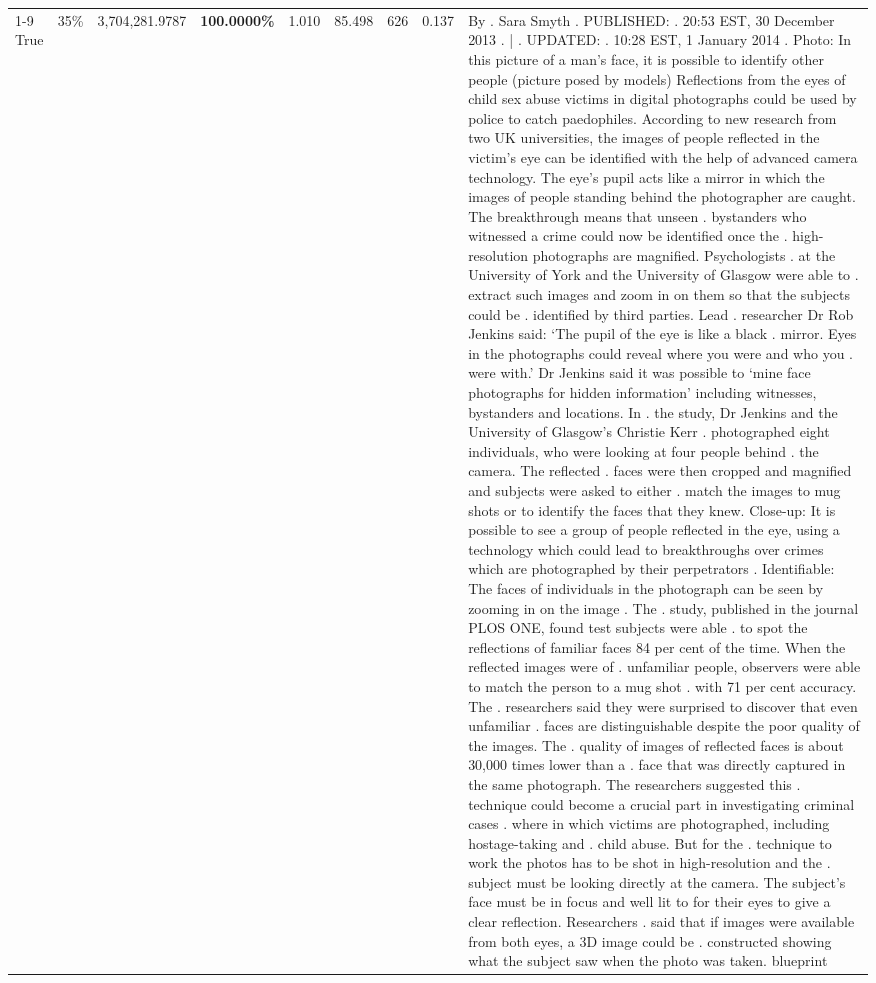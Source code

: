 \begin{table}[H]
\begin{tabular}{lllrlllll}
\cline{1-9} \cline{2-9}
True & 35\% & 3,704,281.9787 & \bfseries \color{red} 100.0000\% & 1.010 & 85.498 & 626 & 0.137 & By . Sara Smyth . PUBLISHED: . 20:53 EST, 30 December 2013 . | . UPDATED: . 10:28 EST, 1 January 2014 . Photo: In this picture of a man's face, it is possible to identify other people (picture posed by models) Reflections from the eyes of child sex abuse victims in digital photographs could be used by police to catch paedophiles. According to new research from two UK universities, the images of people reflected in the victim's eye can be identified with the help of advanced camera technology. The eye's pupil acts like a mirror in which the images of people standing behind the photographer are caught. The breakthrough means that unseen . bystanders who witnessed a crime could now be identified once the . high-resolution photographs are magnified. Psychologists . at the University of York and the University of Glasgow were able to . extract such images and zoom in on them so that the subjects could be . identified by third parties. Lead . researcher Dr Rob Jenkins said: ‘The pupil of the eye is like a black . mirror. Eyes in the photographs could reveal where you were and who you . were with.' Dr Jenkins said it was possible to ‘mine face photographs for hidden information' including witnesses, bystanders and locations. In . the study, Dr Jenkins and the University of Glasgow's Christie Kerr . photographed eight individuals, who were looking at four people behind . the camera. The reflected . faces were then cropped and magnified and subjects were asked to either . match the images to mug shots or to identify the faces that they knew. Close-up: It is possible to see a group of people reflected in the eye, using a technology which could lead to breakthroughs over crimes which are photographed by their perpetrators . Identifiable: The faces of individuals in the photograph can be seen by zooming in on the image . The . study, published in the journal PLOS ONE, found test subjects were able . to spot the reflections of familiar faces 84 per cent of the time. When the reflected images were of . unfamiliar people, observers were able to match the person to a mug shot . with 71 per cent accuracy. The . researchers said they were surprised to discover that even unfamiliar . faces are distinguishable despite the poor quality of the images. The . quality of images of reflected faces is about 30,000 times lower than a . face that was directly captured in the same photograph. The researchers suggested this . technique could become a crucial part in investigating criminal cases . where in which victims are photographed, including hostage-taking and . child abuse. But for the . technique to work the photos has to be shot in high-resolution and the . subject must be looking directly at the camera. The subject's face must be in focus and well lit to for their eyes to give a clear reflection. Researchers . said that if images were available from both eyes, a 3D image could be . constructed showing what the subject saw when the photo was taken. blueprint \\

\end{tabular}
\end{table}
